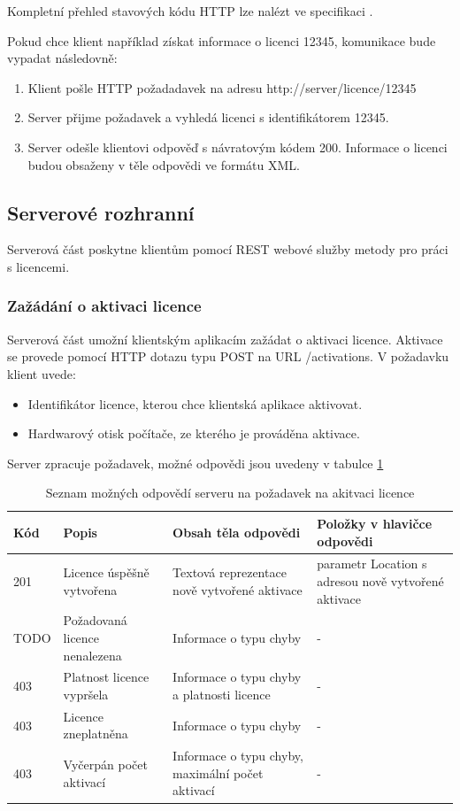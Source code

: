 Kompletní přehled stavových kódu \gls{HTTP} lze nalézt ve specifikaci
\cite{rfc-http}.

Pokud chce klient například získat informace o licenci 12345, komunikace bude
vypadat následovně:

\begin{enumerate}
  \item Klient pošle \gls{HTTP} požadadavek na adresu
  http://server/licence/12345
  \item Server přijme požadavek a vyhledá licenci s identifikátorem 12345.
  \item Server odešle klientovi odpověď s návratovým kódem 200. Informace o
  licenci budou obsaženy v těle odpovědi ve formátu \gls{XML}.
\end{enumerate}

\subsection{Serverové rozhranní}

Serverová část poskytne klientům pomocí \gls{REST} webové služby metody pro
práci s licencemi.

\subsubsection*{Zažádání o aktivaci licence}

Serverová část umožní klientským aplikacím zažádat o aktivaci licence. Aktivace
se provede pomocí \gls{HTTP} dotazu typu POST na \gls{URL} /activations. V
požadavku klient uvede:

\begin{itemize}
  \item Identifikátor licence, kterou chce klientská aplikace aktivovat.
  \item Hardwarový otisk počítače, ze kterého je prováděna aktivace.
\end{itemize}

Server zpracuje požadavek, možné odpovědi jsou uvedeny v tabulce \ref{tab:license-request-responses} 

\begin{table}\centering
	\caption[Results]{Seznam možných odpovědí
	serveru na požadavek na akitvaci licence}\label{tab:license-request-responses}
	\begin{tabular}{|p{1cm}|p{3cm}|p{4cm}|p{3cm}|}\hline 
	Kód		&  Popis	& Obsah těla odpovědi & Položky v hlavičce odpovědi
	\tabularnewline \hline \hline 
	201		& Licence úspěšně vytvořena	& Textová reprezentace nově vytvořené aktivace
	& parametr Location s adresou nově vytvořené aktivace
	\tabularnewline \hline
	TODO	& Požadovaná licence nenalezena & Informace o typu chyby & -
	\tabularnewline \hline
	403		& Platnost licence vypršela & Informace o typu chyby a platnosti licence &
	-
	\tabularnewline \hline
	403		& Licence zneplatněna	& Informace o typu chyby & -
	\tabularnewline \hline
	403 	& Vyčerpán počet aktivací & Informace o typu chyby, maximální počet
	aktivací & -
	 \tabularnewline \hline
	\end{tabular}
\end{table}

